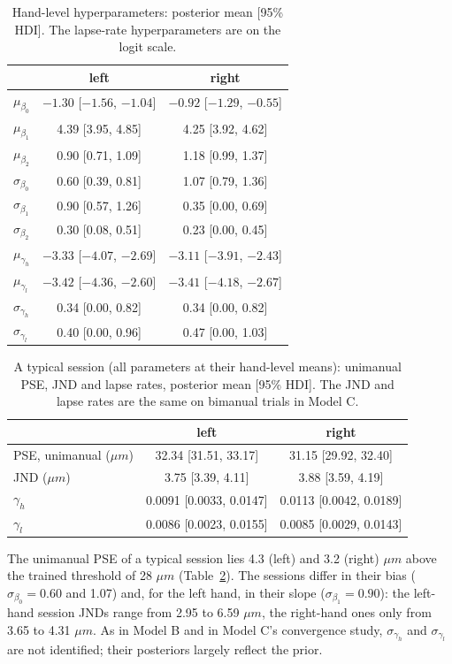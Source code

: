 \documentclass[11pt]{article}
\begin{document}
\begin{table}[H]
\centering
\caption{Hand-level hyperparameters: posterior mean [95\% HDI]. The lapse-rate
hyperparameters are on the logit scale.}
\label{tab:hyper}
\begin{tabular}{lcc}
\toprule
 & left & right \\
\midrule
$\mu_{\beta_0}$ & $-1.30$ [$-1.56$, $-1.04$] & $-0.92$ [$-1.29$, $-0.55$] \\
$\mu_{\beta_1}$ & 4.39 [3.95, 4.85] & 4.25 [3.92, 4.62] \\
$\mu_{\beta_2}$ & 0.90 [0.71, 1.09] & 1.18 [0.99, 1.37] \\
$\sigma_{\beta_0}$ & 0.60 [0.39, 0.81] & 1.07 [0.79, 1.36] \\
$\sigma_{\beta_1}$ & 0.90 [0.57, 1.26] & 0.35 [0.00, 0.69] \\
$\sigma_{\beta_2}$ & 0.30 [0.08, 0.51] & 0.23 [0.00, 0.45] \\
$\mu_{\gamma_h}$ & $-3.33$ [$-4.07$, $-2.69$] & $-3.11$ [$-3.91$, $-2.43$] \\
$\mu_{\gamma_l}$ & $-3.42$ [$-4.36$, $-2.60$] & $-3.41$ [$-4.18$, $-2.67$] \\
$\sigma_{\gamma_h}$ & 0.34 [0.00, 0.82] & 0.34 [0.00, 0.82] \\
$\sigma_{\gamma_l}$ & 0.40 [0.00, 0.96] & 0.47 [0.00, 1.03] \\
\bottomrule
\end{tabular}
\end{table}

\begin{table}[H]
\centering
\caption{A typical session (all parameters at their hand-level means): unimanual
PSE, JND and lapse rates, posterior mean [95\% HDI]. The JND and lapse rates are the
same on bimanual trials in Model C.}
\label{tab:pop}
\begin{tabular}{lcc}
\toprule
 & left & right \\
\midrule
PSE, unimanual ($\mu m$) & 32.34 [31.51, 33.17] & 31.15 [29.92, 32.40] \\
JND ($\mu m$) & 3.75 [3.39, 4.11] & 3.88 [3.59, 4.19] \\
$\gamma_h$ & 0.0091 [0.0033, 0.0147] & 0.0113 [0.0042, 0.0189] \\
$\gamma_l$ & 0.0086 [0.0023, 0.0155] & 0.0085 [0.0029, 0.0143] \\
\bottomrule
\end{tabular}
\end{table}

The unimanual PSE of a typical session lies 4.3 (left) and 3.2 (right) $\mu m$ above
the trained threshold of 28 $\mu m$ (Table~\ref{tab:pop}). The sessions differ in their bias
($\sigma_{\beta_0} = 0.60$ and 1.07) and, for the left hand, in their slope
($\sigma_{\beta_1} = 0.90$): the left-hand session JNDs range from 2.95 to
6.59 $\mu m$, the right-hand ones only from 3.65 to 4.31 $\mu m$. As in Model B and in
Model C's convergence study, $\sigma_{\gamma_h}$ and $\sigma_{\gamma_l}$ are not identified;
their posteriors largely reflect the prior.
\end{document}
